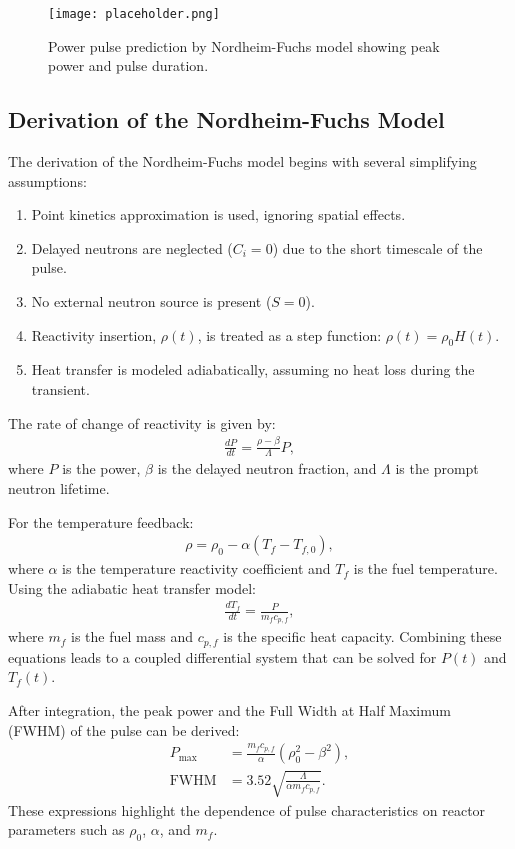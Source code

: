 \begin{figure}[h]
    \centering
    \texttt{[image: placeholder.png]}
    \caption{Power pulse prediction by Nordheim-Fuchs model showing peak power and pulse duration.}
    \label{fig:nordheim_fuchs}
\end{figure}

\subsection{Derivation of the Nordheim-Fuchs Model}
The derivation of the Nordheim-Fuchs model begins with several simplifying assumptions:
\begin{enumerate}
    \item Point kinetics approximation is used, ignoring spatial effects.
    \item Delayed neutrons are neglected ($C_i = 0$) due to the short timescale of the pulse.
    \item No external neutron source is present ($S = 0$).
    \item Reactivity insertion, $\rho(t)$, is treated as a step function: $\rho(t) = \rho_0 H(t)$.
    \item Heat transfer is modeled adiabatically, assuming no heat loss during the transient.
\end{enumerate}
The rate of change of reactivity is given by:
\begin{align*}
    \frac{dP}{dt} = \frac{\rho - \beta}{\Lambda}P,
\end{align*}
where $P$ is the power, $\beta$ is the delayed neutron fraction, and $\Lambda$ is the prompt neutron lifetime. 

For the temperature feedback:
\begin{align*}
    \rho = \rho_0 - \alpha(T_f - T_{f,0}),
\end{align*}
where $\alpha$ is the temperature reactivity coefficient and $T_f$ is the fuel temperature. Using the adiabatic heat transfer model:
\begin{align*}
    \frac{dT_f}{dt} = \frac{P}{m_f c_{p,f}},
\end{align*}
where $m_f$ is the fuel mass and $c_{p,f}$ is the specific heat capacity. Combining these equations leads to a coupled differential system that can be solved for $P(t)$ and $T_f(t)$.

After integration, the peak power and the Full Width at Half Maximum (FWHM) of the pulse can be derived:
\begin{align*}
    P_{\text{max}} &= \frac{m_f c_{p,f}}{\alpha}\left(\rho_0^2 - \beta^2\right), \\
    \text{FWHM} &= 3.52\sqrt{\frac{\Lambda}{\alpha m_f c_{p,f}}}.
\end{align*}
These expressions highlight the dependence of pulse characteristics on reactor parameters such as $\rho_0$, $\alpha$, and $m_f$.

